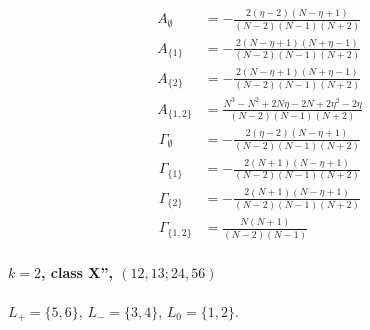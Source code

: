 \documentclass[11pt]{article}
\begin{document}
\begin{align*}
  A_{\emptyset} &= - \frac{2 \left(\eta - 2\right) \left(N - \eta + 1\right)}{\left(N - 2\right) \left(N - 1\right) \left(N + 2\right)} \\
  A_{\{1\}} &= - \frac{2 \left(N - \eta + 1\right) \left(N + \eta - 1\right)}{\left(N - 2\right) \left(N - 1\right) \left(N + 2\right)} \\
  A_{\{2\}} &= - \frac{2 \left(N - \eta + 1\right) \left(N + \eta - 1\right)}{\left(N - 2\right) \left(N - 1\right) \left(N + 2\right)} \\
  A_{\{1,2\}} &= \frac{N^{3} - N^{2} + 2 N \eta - 2 N + 2 \eta^{2} - 2 \eta}{\left(N - 2\right) \left(N - 1\right) \left(N + 2\right)} 
\end{align*}
\begin{align*}
  \Gamma_{\emptyset} &= - \frac{2 \left(\eta - 2\right) \left(N - \eta + 1\right)}{\left(N - 2\right) \left(N - 1\right) \left(N + 2\right)} \\
  \Gamma_{\{1\}} &= - \frac{2 \left(N + 1\right) \left(N - \eta + 1\right)}{\left(N - 2\right) \left(N - 1\right) \left(N + 2\right)} \\
  \Gamma_{\{2\}} &= - \frac{2 \left(N + 1\right) \left(N - \eta + 1\right)}{\left(N - 2\right) \left(N - 1\right) \left(N + 2\right)} \\
  \Gamma_{\{1,2\}} &= \frac{N \left(N + 1\right)}{\left(N - 2\right) \left(N - 1\right)} 
\end{align*}

\paragraph{$k=2$, class X'', $(12,13;24,56)$}

$L_+=\{5,6\}$, $L_-=\{3,4\}$, $L_0=\{1,2\}$.
\end{document}

